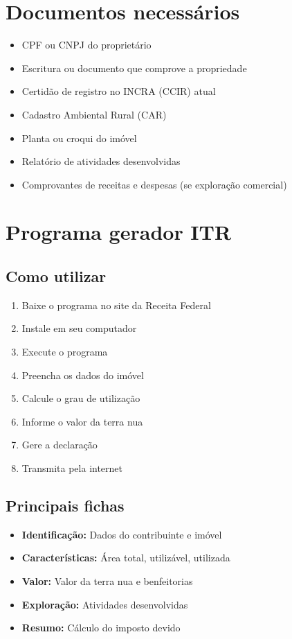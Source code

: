 \documentclass[12pt,a4paper]{article}
\begin{document}
\section{Documentos necessários}

\begin{itemize}
    \item CPF ou CNPJ do proprietário
    \item Escritura ou documento que comprove a propriedade
    \item Certidão de registro no INCRA (CCIR) atual
    \item Cadastro Ambiental Rural (CAR)
    \item Planta ou croqui do imóvel
    \item Relatório de atividades desenvolvidas
    \item Comprovantes de receitas e despesas (se exploração comercial)
\end{itemize}

\section{Programa gerador ITR}

\subsection{Como utilizar}
\begin{enumerate}
    \item Baixe o programa no site da Receita Federal
    \item Instale em seu computador
    \item Execute o programa
    \item Preencha os dados do imóvel
    \item Calcule o grau de utilização
    \item Informe o valor da terra nua
    \item Gere a declaração
    \item Transmita pela internet
\end{enumerate}

\subsection{Principais fichas}
\begin{itemize}
    \item \textbf{Identificação:} Dados do contribuinte e imóvel
    \item \textbf{Características:} Área total, utilizável, utilizada
    \item \textbf{Valor:} Valor da terra nua e benfeitorias
    \item \textbf{Exploração:} Atividades desenvolvidas
    \item \textbf{Resumo:} Cálculo do imposto devido
\end{itemize}
\end{document}
